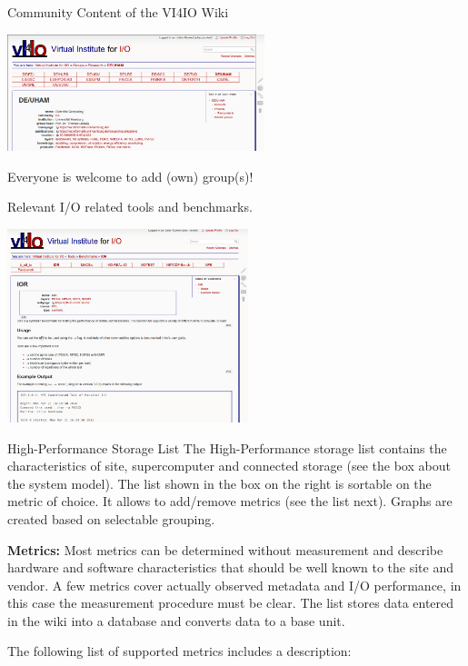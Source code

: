 \documentclass[portrait,a0paper,fontscale=0.4]{baposter}
\begin{document}
\begin{poster}
\begin{posterbox}[name=concept,column=1,span=2]{Community Content of the VI4IO Wiki}
\begin{minipage}{7cm}
\includegraphics[width=7.5cm]{groups}

Everyone is welcome to add (own) group(s)!

\end{minipage}
\hfill
\begin{minipage}{7.5cm}

Relevant I/O related tools and benchmarks.

\vspace*{1em}

\includegraphics[width=7cm]{benchmark}
\end{minipage}
\end{posterbox}


\begin{posterbox}[name=schedule,column=1,span=2, below=concept]{High-Performance Storage List}
The High-Performance storage list contains the characteristics of site, supercomputer and connected storage (see the box about the system model).
The list shown in the box on the right is sortable on the metric of choice.
It allows to add/remove metrics (see the list next).
Graphs are created based on selectable grouping.


\textbf{Metrics:} Most metrics can be determined without measurement and describe hardware and software characteristics that should be well known to the site and vendor. A few metrics cover actually observed metadata and I/O performance, in this case the measurement procedure must be clear.
The list stores data entered in the wiki into a database and converts data to a base unit.

The following list of supported metrics includes a description:


\end{posterbox}
\end{poster}
\end{document}

